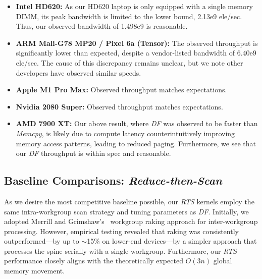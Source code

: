 \documentclass[acmsmall, manuscript, screen, review, anonymous]{acmart}
\begin{document}
\begin{itemize}
  \item \textbf{Intel HD620:} As our HD620 laptop is only equipped with a single memory DIMM, its peak bandwidth is limited to the lower bound, 2.13e9 ele/sec. Thus, our observed bandwidth of 1.498e9 is reasonable.
  \item \textbf{ARM Mali-G78 MP20 / Pixel 6a (Tensor):} The observed throughput is significantly lower than expected, despite a vendor-listed bandwidth of 6.40e9 ele/sec. The cause of this discrepancy remains unclear, but we note other developers have observed similar speeds.
  \item \textbf{Apple M1 Pro Max:} Observed throughput matches expectations.
  \item \textbf{Nvidia 2080 Super:} Observed throughput matches expectations.
  \item \textbf{AMD 7900 XT:} Our above result, where \emph{DF} was observed to be faster than \emph{Memcpy}, is likely due to compute latency counterintuitively improving memory access patterns, leading to reduced paging. Furthermore, we see that our \emph{DF} throughput is within spec and reasonable.
\end{itemize}

\subsection{Baseline Comparisons: \emph{Reduce-then-Scan}}
\label{sec:rts}
As we desire the most competitive baseline possible, our \emph{RTS} kernels employ the same intra-workgroup scan strategy and tuning parameters as \emph{DF}. Initially, we adopted Merrill and Grimshaw's~\cite{Merrill2009} workgroup raking approach for inter-workgroup processing. However, empirical testing revealed that raking was consistently outperformed—by up to $\sim$15\% on lower-end devices—by a simpler approach that processes the spine serially with a single workgroup. Furthermore, our \emph{RTS} performance closely aligns with the theoretically expected $O(3n)$ global memory movement.
\end{document}
